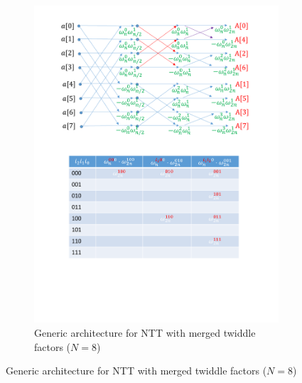 \documentclass[submission]{iacrtrans}
\theoremstyle{plain}
\begin{document}
\begin{figure}[!tb]
\centering
\begin{subfigure}[t]{0.85\textwidth}\centering
\includegraphics[width=\textwidth]{./fig/DIT1.pdf}
\caption{Generic architecture for NTT with merged twiddle factors ($N=8$)}
\label{fig:dit1}
\end{subfigure}



\end{figure}
\end{document}
